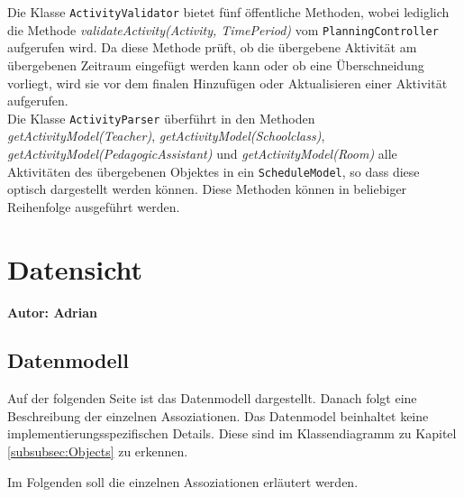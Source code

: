 \documentclass[fontsize=12pt,paper=a4,twoside]{scrartcl}
\begin{document}
Die Klasse \texttt{ActivityValidator} bietet fünf öffentliche Methoden, wobei lediglich die Methode \textit{validateActivity(Activity, TimePeriod)} vom \texttt{PlanningController} aufgerufen wird. Da diese Methode prüft, ob die übergebene Aktivität am übergebenen Zeitraum eingefügt werden kann oder ob eine Überschneidung vorliegt, wird sie vor dem finalen Hinzufügen oder Aktualisieren einer Aktivität aufgerufen.\\
Die Klasse \texttt{ActivityParser} überführt in den Methoden \textit{getActivityModel(Teacher)}, \textit{getActivityModel(Schoolclass)}, \textit{getActivityModel(PedagogicAssistant)} und \textit{getActivityModel(Room)} alle Aktivitäten des übergebenen Objektes in ein \texttt{ScheduleModel}, so dass diese optisch dargestellt werden können. Diese Methoden können in beliebiger Reihenfolge ausgeführt werden.
 






\section{Datensicht}
\label{sec:datensicht}
\textbf{Autor: Adrian}\\
  
\subsection{Datenmodell}
Auf der folgenden Seite ist das Datenmodell dargestellt. Danach folgt eine Beschreibung der einzelnen Assoziationen. Das Datenmodel beinhaltet keine implementierungsspezifischen Details. Diese sind im Klassendiagramm zu Kapitel \ref{subsubsec:Objects} zu erkennen.

Im Folgenden soll die einzelnen Assoziationen erläutert werden.\\
\end{document}
